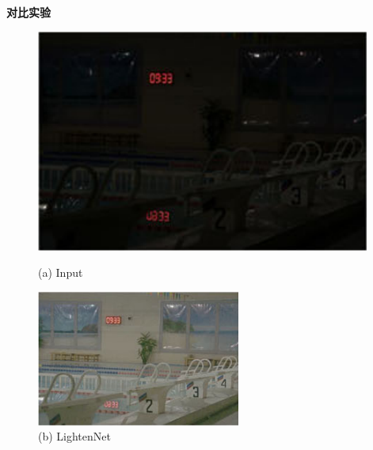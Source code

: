 \documentclass[CJK,aspectratio=169]{beamer}  %
\begin{document}
	\begin{frame}
	{ \yahei \textbf{对比实验}}
	
		\begin{figure}
		\centering 
		\setlength{\abovecaptionskip}{-0.05cm}
		\begin{minipage}{0.19\textwidth}
			\includegraphics[width=\linewidth]{picture/LLIE/Efficent/Input}
			\caption*{\tiny (a) Input}
			\label{fig: LLI Input}
		\end{minipage}
		\begin{minipage}{0.19\textwidth}
			\includegraphics[width=\linewidth]{picture/LLIE/Efficent/LightenNet}
			\caption*{\tiny (b) LightenNet}
			\label{fig: LightenNet}
		\end{minipage}
		\begin{minipage}{0.19\textwidth}

\end{minipage}
\end{figure}
\end{frame}
\end{document}
